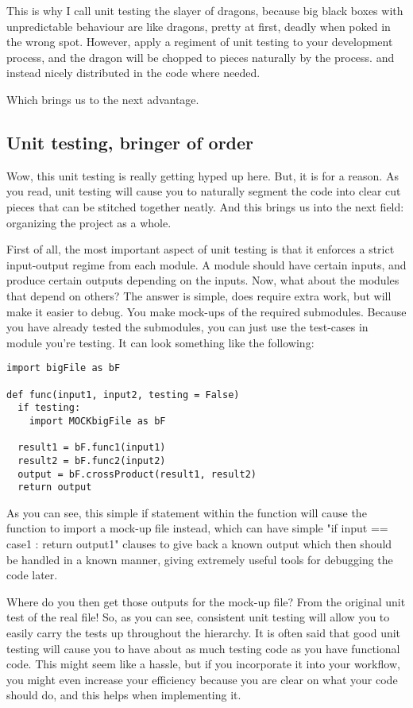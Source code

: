 \documentclass[10pt,a4paper]{article}
\begin{document}
This is why I call unit testing the slayer of dragons, because big black boxes with unpredictable behaviour are like dragons, pretty at first, deadly when poked in the wrong spot. However, apply a regiment of unit testing to your development process, and the dragon will be chopped to pieces naturally by the process. and instead nicely distributed in the code where needed. 

Which brings us to the next advantage.

\subsection{Unit testing, bringer of order}
Wow, this unit testing is really getting hyped up here. But, it is for a reason. As you read, unit testing will cause you to naturally segment the code into clear cut pieces that can be stitched together neatly. And this brings us into the next field: organizing the project as a whole. 

First of all, the most important aspect of unit testing is that it enforces a strict input-output regime from each module. A module should have certain inputs, and produce certain outputs depending on the inputs. Now, what about the modules that depend on others? The answer is simple, does require extra work, but will make it easier to debug. You make mock-ups of the required submodules. Because you have already tested the submodules, you can just use the test-cases in module you're testing. It can look something like the following:


\begin{lstlisting}
import bigFile as bF

def func(input1, input2, testing = False)
  if testing:
    import MOCKbigFile as bF
  
  result1 = bF.func1(input1)
  result2 = bF.func2(input2)
  output = bF.crossProduct(result1, result2)
  return output

\end{lstlisting}
As you can see, this simple if statement within the function will cause the function to import a mock-up file instead, which can have simple "if input == case1 : return output1" clauses to give back a known output which then should be handled in a known manner, giving extremely useful tools for debugging the code later. 

Where do you then get those outputs for the mock-up file? From the original unit test of the real file! So, as you can see, consistent unit testing will allow you to easily carry the tests up throughout the hierarchy. It is often said that good unit testing will cause you to have about as much testing code as you have functional code. This might seem like a hassle, but if you incorporate it into your workflow, you might even increase your efficiency because you are clear on what your code should do, and this helps when implementing it. 
\end{document}
